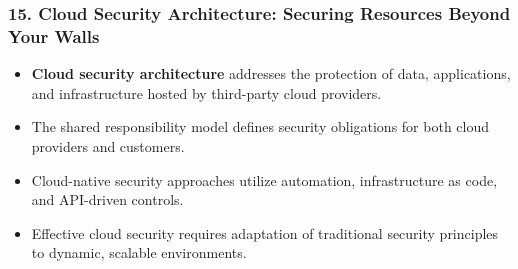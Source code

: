 \documentclass{beamer}
\begin{document}
	\begin{frame}
		\frametitle{15. Cloud Security Architecture: Securing Resources Beyond Your Walls}
		\begin{itemize}
			\item \textbf{Cloud security architecture} addresses the protection of data, applications, and infrastructure hosted by third-party cloud providers.
			\item The shared responsibility model defines security obligations for both cloud providers and customers.
			\item Cloud-native security approaches utilize automation, infrastructure as code, and API-driven controls.
			\item Effective cloud security requires adaptation of traditional security principles to dynamic, scalable environments.
		\end{itemize}
		
	\end{frame}
\end{document}
